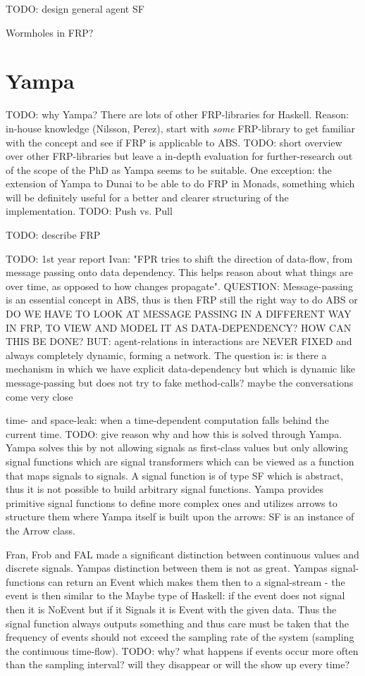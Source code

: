 TODO: design general agent SF 

Wormholes in FRP? 

\section{Yampa}
TODO: why Yampa? There are lots of other FRP-libraries for Haskell. Reason: in-house knowledge (Nilsson, Perez), start with \textit{some} FRP-library to get familiar with the concept and see if FRP is applicable to ABS. TODO: short overview over other FRP-libraries but leave a in-depth evaluation for further-research out of the scope of the PhD as Yampa seems to be suitable. One exception: the extension of Yampa to Dunai to be able to do FRP in Monads, something which will be definitely useful for a better and clearer structuring of the implementation.
TODO: Push vs. Pull

TODO: describe FRP

TODO: 1st year report Ivan: "FPR tries to shift the direction of data-flow, from message passing onto data dependency. This helps reason about what things are over time, as opposed to how changes propagate". QUESTION: Message-passing is an essential concept in ABS, thus is then FRP still the right way to do ABS or DO WE HAVE TO LOOK AT MESSAGE PASSING IN A DIFFERENT WAY IN FRP, TO VIEW AND MODEL IT AS DATA-DEPENDENCY? HOW CAN THIS BE DONE?
BUT: agent-relations in interactions are NEVER FIXED and always completely dynamic, forming a network. The question is: is there a mechanism in which we have explicit data-dependency but which is dynamic like message-passing but does not try to fake method-calls? maybe the conversations come very close

time- and space-leak: when a time-dependent computation falls behind the current time. TODO: give reason why and how this is solved through Yampa.
Yampa solves this by not allowing signals as first-class values but only allowing signal functions which are signal transformers which can be viewed as a function that maps signals to signals. A signal function is of type SF which is abstract, thus it is not possible to build arbitrary signal functions. Yampa provides primitive signal functions to define more complex ones and utilizes arrows \cite{hughes_programming_2005} to structure them where Yampa itself is built upon the arrows: SF is an instance of the Arrow class. 

Fran, Frob and FAL made a significant distinction between continuous values and discrete signals. Yampas distinction between them is not as great. Yampas signal-functions can return an Event which makes them then to a signal-stream - the event is then similar to the Maybe type of Haskell: if the event does not signal then it is NoEvent but if it Signals it is Event with the given data. Thus the signal function always outputs something and thus care must be taken that the frequency of events should not exceed the sampling rate of the system (sampling the continuous time-flow). TODO: why? what happens if events occur more often than the sampling interval? will they disappear or will the show up every time?

